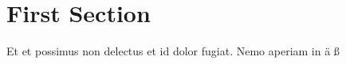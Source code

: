 \documentclass{scrbook}
\begin{document}
    \section{First Section}
        Et et possimus non delectus et id dolor fugiat. Nemo aperiam in
        \"a \ss
\end{document}
